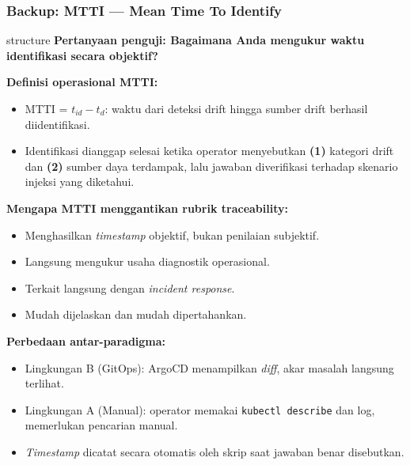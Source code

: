 {
\usebackgroundtemplate{\backgroundcontent}
\begin{frame}
    \frametitle{Backup: MTTI --- Mean Time To Identify}
    \vspace{0.02cm}
    \scriptsize
    \begin{beamercolorbox}[wd=\textwidth, sep=0.20cm, center, rounded=true]{structure}
        \small\bfseries Pertanyaan penguji: Bagaimana Anda mengukur waktu identifikasi secara objektif?
    \end{beamercolorbox}
    \vspace{0.08cm}
    \textbf{Definisi operasional MTTI:}
    \begin{itemize}
        \item MTTI = $t_{id} - t_d$: waktu dari deteksi drift hingga sumber drift berhasil diidentifikasi.
        \item Identifikasi dianggap selesai ketika operator menyebutkan \textbf{(1)} kategori drift dan \textbf{(2)} sumber daya terdampak, lalu jawaban diverifikasi terhadap skenario injeksi yang diketahui.
    \end{itemize}
    \vspace{0.06cm}
    \textbf{Mengapa MTTI menggantikan rubrik traceability:}
    \begin{itemize}
        \item Menghasilkan \textit{timestamp} objektif, bukan penilaian subjektif.
        \item Langsung mengukur usaha diagnostik operasional.
        \item Terkait langsung dengan \textit{incident response}.
        \item Mudah dijelaskan dan mudah dipertahankan.
    \end{itemize}
    \vspace{0.06cm}
    \textbf{Perbedaan antar-paradigma:}
    \begin{itemize}
        \item Lingkungan B (GitOps): ArgoCD menampilkan \textit{diff}, akar masalah langsung terlihat.
        \item Lingkungan A (Manual): operator memakai \texttt{kubectl describe} dan log, memerlukan pencarian manual.
        \item \textit{Timestamp} dicatat secara otomatis oleh skrip saat jawaban benar disebutkan.
    \end{itemize}
\end{frame}
}

